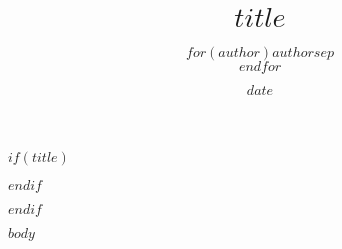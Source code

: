 \documentclass[
  10pt,
  parskip,
  a4paper,
  oneside,
]{scrartcl}
\title{$title$}
\author{$for(author)$$author$$sep$\\$endfor$}
\date{$date$}
\begin{document}
$if(title)$
\maketitle
$endif$

$endif$

$body$
\end{document}
